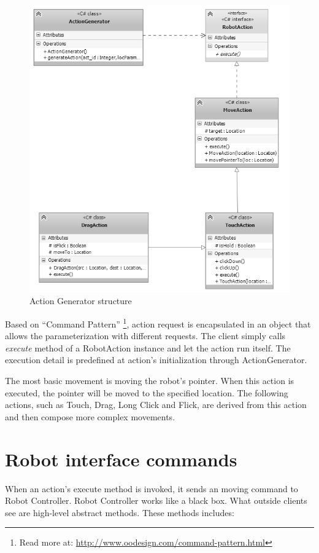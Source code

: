 	\begin{figure}[H]
		\centering
		\includegraphics[scale=0.75]{Chapters/Fig/act_gen.png}
		\caption{Action Generator structure}
		\label{fig:act_gen}
	\end{figure}

Based on ``Command Pattern'' \footnote{Read more at: \url{http://www.oodesign.com/command-pattern.html}}, action request is encapsulated in an object that allows the parameterization with different requests. The client simply calls \textit{execute} method of a RobotAction instance and let the action run itself. The execution detail is predefined at action's initialization through ActionGenerator.

The most basic movement is moving the robot's pointer. When this action is executed, the pointer will be moved to the specified location. The following actions, such as Touch, Drag, Long Click and Flick, are derived from this action and then compose more complex movements.

\section{Robot interface commands}
When an action's execute method is invoked, it sends an moving command to Robot Controller. Robot Controller works like a black box. What outside clients see are high-level abstract methods. These methods includes:

